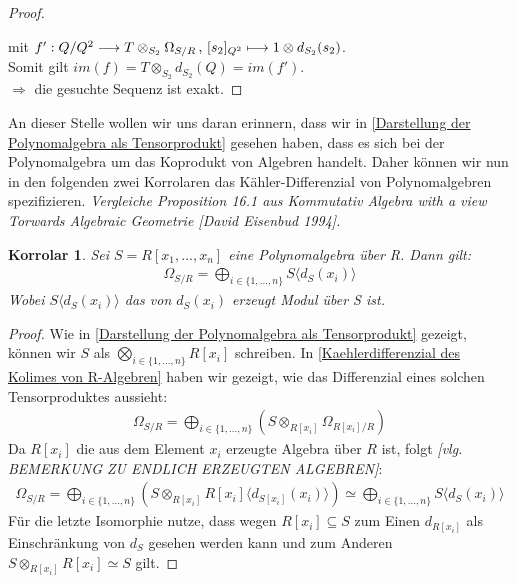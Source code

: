 \documentclass[10pt,a4paper]{report}
\newcommand{\ModulsOfDifferenzials}{Kommutativ Algebra with a view Torwards Algebraic Geometrie [David Eisenbud 1994]}
\newcounter{Aussage}[chapter]
\newtheorem{korrolar}[Aussage]{Korrolar}
\newcommand{\function}[5]{\nolinebreak{#1:#2 \longrightarrow #3 \, , \, #4 \longmapsto #5}}
\newcommand{\divR}[2]{\Omega_{#1/#2}}
\newcommand{\divf}[1]{d_{#1}}
\newcommand{\Tensor}[3]{#1 \otimes_{#2} #3}
\newcommand{\tensor}[3]{#1 \otimes #3}
\newcommand{\immage}[1]{im(#1)}
\begin{document}
\begin{proof}
\begin{center}
\end{center}
mit $\function{f'}{Q/Q^2}{{\Tensor{T}{S_2}{\divR{S}{R}}}}{[s_2]_{Q^2}}{\tensor{1}{S_2}{\divf{S_2}(s_2)}}$.\\
Somit gilt $\immage{f} = \Tensor{T}{S_2}{\divf{S_2}(Q)} = \immage{f'}$.\\
$\Rightarrow$ die gesuchte Sequenz ist exakt.
\end{proof}


An dieser Stelle wollen wir uns daran erinnern, dass wir in \cref{Darstellung der Polynomalgebra als Tensorprodukt} gesehen haben, dass es sich bei der Polynomalgebra um das Koprodukt von Algebren handelt. Daher können wir nun in den folgenden zwei Korrolaren das Kähler-Differenzial von Polynomalgebren spezifizieren.
\textit{ Vergleiche Proposition 16.1 aus \ModulsOfDifferenzials.}
\begin{korrolar}\label{Differenzial von Polynomalgebren 1}
Sei $S = R[x_1,...,x_n]$ eine Polynomalgebra über R. Dann gilt:
\begin{gather*}
\divR{S}{R} = \bigoplus_{i \in \lbrace 1,...,n \rbrace} S \langle \divf{S}(x_i) \rangle 
\end{gather*}
Wobei $S\langle \divf{S}(x_i)\rangle$ das von $\divf{S}(x_i)$ erzeugt Modul über S ist.
\end{korrolar}
\begin{proof}
Wie in \cref{Darstellung der Polynomalgebra als Tensorprodukt} gezeigt, können wir $S$ als $\bigotimes_{i \in \lbrace 1,...,n \rbrace} R[x_i]$ schreiben. In \cref{Kaehlerdifferenzial des Kolimes von R-Algebren} haben wir gezeigt, wie das Differenzial eines solchen Tensorproduktes aussieht:
\begin{gather*}
\divR{S}{R} = \bigoplus_{i \in \lbrace 1,...,n \rbrace} (\Tensor{S}{R[x_i]}{\divR{R[x_i]}{R}})
\end{gather*}
Da $R[x_i]$ die aus dem Element $x_i$ erzeugte Algebra über $R$ ist, folgt \textit{[vlg. BEMERKUNG ZU ENDLICH ERZEUGTEN ALGEBREN]}: 
\begin{gather*}
\divR{S}{R} = \bigoplus_{i \in \lbrace 1,...,n \rbrace} (\Tensor{S}{R[x_i]}{R[x_i]\langle \divf{S[x_i]}(x_i) \rangle})
\simeq \bigoplus_{i \in \lbrace 1,...,n \rbrace} S \langle \divf{S}(x_i) \rangle 
\end{gather*}
Für die letzte Isomorphie nutze, dass wegen $R[x_i] \subseteq S$ zum Einen $\divf{R[x_i]}$ als Einschränkung von $\divf{S}$ gesehen werden kann und zum Anderen $\Tensor{S}{R[x_i]}{R[x_i]} \simeq S$ gilt.
\end{proof}
\end{document}
